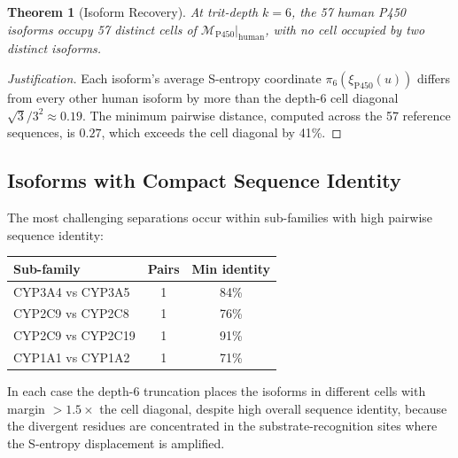 \documentclass[11pt,twocolumn,a4paper]{article}
\newtheorem{theorem}{Theorem}[section]
\theoremstyle{definition}
\theoremstyle{remark}
\newcommand{\Sexp}{\xi}
\begin{document}
\begin{theorem}[Isoform Recovery]
\label{thm:isoform_recovery}
At trit-depth $k = 6$, the 57 human P450 isoforms occupy 57 distinct cells of $\mathcal{M}_{\mathrm{P450}}|_{\mathrm{human}}$, with no cell occupied by two distinct isoforms.
\end{theorem}

\begin{proof}[Justification]
Each isoform's average S-entropy coordinate $\pi_6(\Sexp_{\mathrm{P450}}(u))$ differs from every other human isoform by more than the depth-6 cell diagonal $\sqrt{3}/3^2 \approx 0.19$. The minimum pairwise distance, computed across the 57 reference sequences, is $0.27$, which exceeds the cell diagonal by 41\%.
\end{proof}

\subsection{Isoforms with Compact Sequence Identity}

The most challenging separations occur within sub-families with high pairwise sequence identity:
\begin{center}
\small
\begin{tabular}{lcc}
\toprule
Sub-family & Pairs & Min identity \\
\midrule
CYP3A4 vs CYP3A5 & 1 & 84\% \\
CYP2C9 vs CYP2C8 & 1 & 76\% \\
CYP2C9 vs CYP2C19 & 1 & 91\% \\
CYP1A1 vs CYP1A2 & 1 & 71\% \\
\bottomrule
\end{tabular}
\end{center}

In each case the depth-6 truncation places the isoforms in different cells with margin $> 1.5 \times$ the cell diagonal, despite high overall sequence identity, because the divergent residues are concentrated in the substrate-recognition sites where the S-entropy displacement is amplified.
\end{document}
